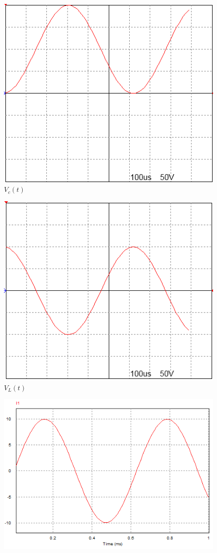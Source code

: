 \documentclass[titlepage, a4paper, 11pt, reqno, openany]{report}
\begin{document}
\begin{enumerate}
\begin{enumerate}
\begin{figure}[H]
\includegraphics[scale=1]{./image/PSIM_1.png}
\caption{$V_c(t)$}
\label{figura 6}
\end{figure}\par
%
\begin{figure}[H]
\centering
\includegraphics[scale=1]{./image/PSIM_2.png}
\caption{$V_L(t)$}
\label{figura 7}
\end{figure}\par
%
\begin{figure}[H]
\centering
\includegraphics[scale=1]{./image/PSIM_3.png}

\end{figure}
\end{enumerate}
\end{enumerate}
\end{document}

